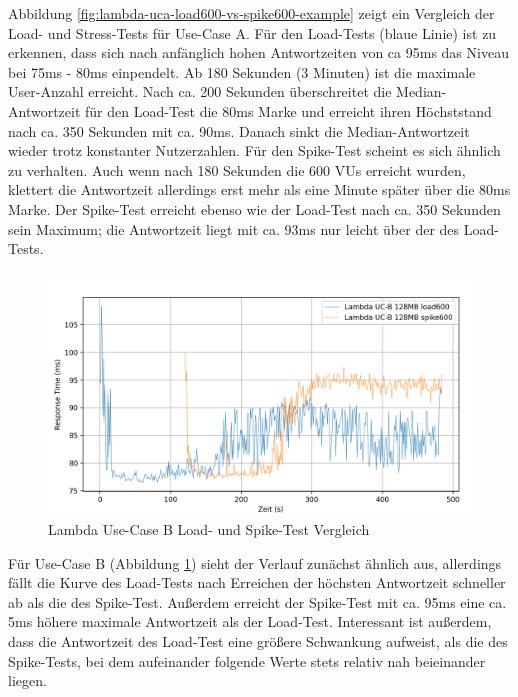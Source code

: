 Abbildung \ref{fig:lambda-uca-load600-vs-spike600-example} zeigt ein Vergleich der Load- und Stress-Tests für Use-Case A. Für den Load-Tests (blaue Linie) ist zu erkennen, dass sich nach anfänglich hohen Antwortzeiten von ca 95ms das Niveau bei 75ms - 80ms einpendelt. Ab 180 Sekunden (3 Minuten) ist die maximale User-Anzahl erreicht. Nach ca. 200 Sekunden überschreitet die Median-Antwortzeit für den Load-Test die 80ms Marke und erreicht ihren Höchststand nach ca. 350 Sekunden mit ca. 90ms. Danach sinkt die Median-Antwortzeit wieder trotz konstanter Nutzerzahlen.
Für den Spike-Test scheint es sich ähnlich zu verhalten. Auch wenn nach 180 Sekunden die 600 VUs erreicht wurden, klettert die Antwortzeit allerdings erst mehr als eine Minute später über die 80ms Marke. Der Spike-Test erreicht ebenso wie der Load-Test nach ca. 350 Sekunden sein Maximum; die Antwortzeit liegt mit ca. 93ms nur leicht über der des Load-Tests.

\begin{figure}[H]
    \includegraphics[width=\textwidth]{img/lambda-ucb-load600-vs-spike600-example.png}
    \caption[Lambda Use-Case B Load- und Spike-Test Vergleich]{Lambda Use-Case B Load- und Spike-Test Vergleich}
    \label{fig:lambda-ucb-load600-vs-spike600-example}
\end{figure}

Für Use-Case B (Abbildung \ref{fig:lambda-ucb-load600-vs-spike600-example}) sieht der Verlauf zunächst ähnlich aus, allerdings fällt die Kurve des Load-Tests nach Erreichen der höchsten Antwortzeit schneller ab als die des Spike-Test. Außerdem erreicht der Spike-Test mit ca. 95ms eine ca. 5ms höhere maximale Antwortzeit als der Load-Test. Interessant ist außerdem, dass die Antwortzeit des Load-Test eine größere Schwankung aufweist, als die des Spike-Tests, bei dem aufeinander folgende Werte stets relativ nah beieinander liegen.

